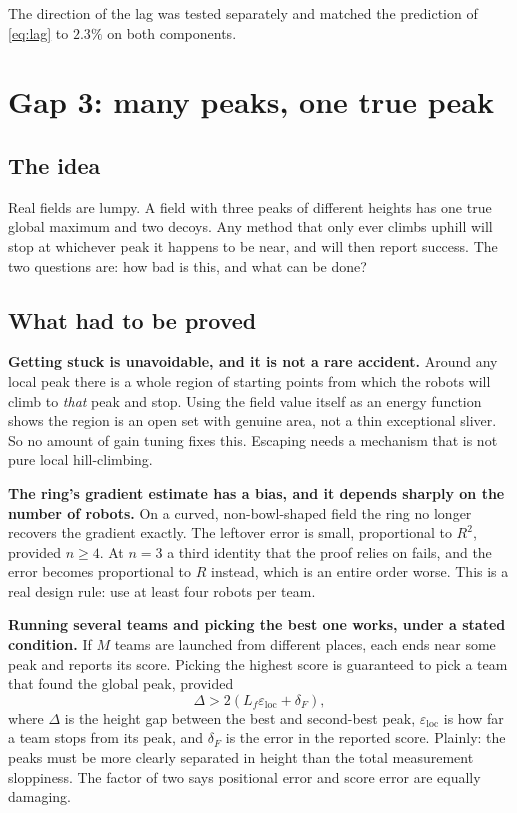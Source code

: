 \documentclass[11pt,a4paper]{article}
\begin{document}
The direction of the lag was tested separately and matched the prediction of \eqref{eq:lag} to
$2.3\%$ on both components.

\section{Gap 3: many peaks, one true peak}

\subsection{The idea}

Real fields are lumpy. A field with three peaks of different heights has one true global maximum and
two decoys. Any method that only ever climbs uphill will stop at whichever peak it happens to be
near, and will then report success. The two questions are: how bad is this, and what can be done?

\subsection{What had to be proved}

\textbf{Getting stuck is unavoidable, and it is not a rare accident.} Around any local peak there is
a whole region of starting points from which the robots will climb to \emph{that} peak and stop.
Using the field value itself as an energy function shows the region is an open set with genuine area,
not a thin exceptional sliver. So no amount of gain tuning fixes this. Escaping needs a mechanism
that is not pure local hill-climbing.

\textbf{The ring's gradient estimate has a bias, and it depends sharply on the number of robots.}
On a curved, non-bowl-shaped field the ring no longer recovers the gradient exactly. The leftover
error is small, proportional to $R^2$, provided $n \geq 4$. At $n = 3$ a third identity that the
proof relies on fails, and the error becomes proportional to $R$ instead, which is an entire order
worse. This is a real design rule: use at least four robots per team.

\textbf{Running several teams and picking the best one works, under a stated condition.} If $M$
teams are launched from different places, each ends near some peak and reports its score. Picking the
highest score is guaranteed to pick a team that found the global peak, provided
\begin{equation}\label{eq:selection}
    \Delta > 2\left( L_f \varepsilon_{\mathrm{loc}} + \delta_F \right),
\end{equation}
where $\Delta$ is the height gap between the best and second-best peak, $\varepsilon_{\mathrm{loc}}$
is how far a team stops from its peak, and $\delta_F$ is the error in the reported score. Plainly:
the peaks must be more clearly separated in height than the total measurement sloppiness. The
factor of two says positional error and score error are equally damaging.
\end{document}
